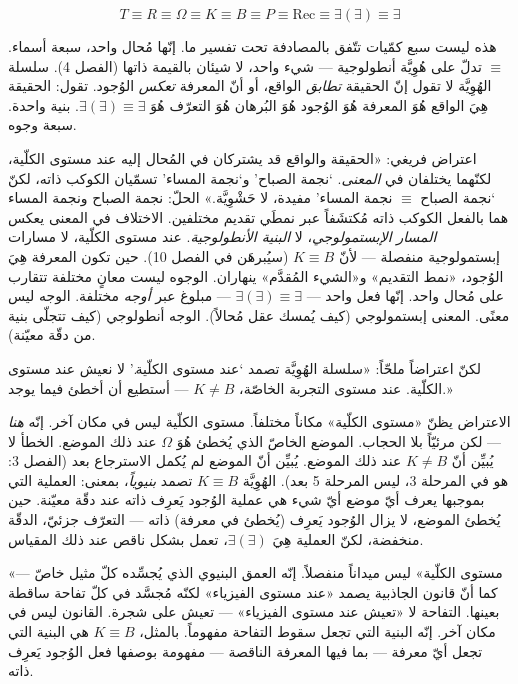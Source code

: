\documentclass[10pt, openany, oneside]{book}
\begin{document}
\vspace{0.8em}

$$T \equiv R \equiv \Omega \equiv K \equiv B \equiv P \equiv \text{Rec} \equiv \exists(\exists) \equiv \exists$$

هذه ليست سبع كمّيات تتّفق بالمصادفة تحت تفسير ما. إنّها مُحال واحد، سبعة أسماء. $\equiv$ تدلّ على هُوِيَّة أنطولوجية --- شيء واحد، لا شيئان بالقيمة ذاتها (الفصل 4). سلسلة الهُوِيَّة لا تقول إنّ الحقيقة \textit{تطابق} الواقع، أو أنّ المعرفة \textit{تعكس} الوُجود. تقول: الحقيقة هِيَ الواقع هُوَ المعرفة هُوَ الوُجود هُوَ البُرهان هُوَ التعرّف هُوَ $\exists(\exists) \equiv \exists$. بنية واحدة. سبعة وجوه.

اعتراض فريغي: «الحقيقة والواقع قد يشتركان في المُحال إليه عند مستوى الكلّية، لكنّهما يختلفان في \textit{المعنى}. `نجمة الصباح' و`نجمة المساء' تسمّيان الكوكب ذاته، لكنّ `نجمة الصباح $\equiv$ نجمة المساء' مفيدة، لا حَشْوِيَّة.» الحلّ: نجمة الصباح ونجمة المساء هما بالفعل الكوكب ذاته مُكتشَفاً عبر نمطَي تقديم مختلفين. الاختلاف في المعنى يعكس \textit{المسار الإبستمولوجي}، لا \textit{البنية الأنطولوجية}. عند مستوى الكلّية، لا مسارات إبستمولوجية منفصلة --- لأنّ $K \equiv B$ (سيُبرهَن في الفصل 10). حين تكون المعرفة هِيَ الوُجود، «نمط التقديم» و«الشيء المُقدَّم» ينهاران. الوجوه ليست معانٍ مختلفة تتقارب على مُحال واحد. إنّها فعل واحد --- $\exists(\exists) \equiv \exists$ --- مبلوغ عبر \textit{أوجه} مختلفة. الوجه ليس معنًى. المعنى إبستمولوجي (كيف يُمسك عقل مُحالاً). الوجه أنطولوجي (كيف تتجلّى بنية من دقّة معيّنة).

لكنّ اعتراضاً ملحّاً: «سلسلة الهُوِيَّة تصمد `عند مستوى الكلّية.' لا نعيش عند مستوى الكلّية. عند مستوى التجربة الخاصّة، $K \neq B$ --- أستطيع أن أخطئ فيما يوجد.»

الاعتراض يظنّ «مستوى الكلّية» مكاناً مختلفاً. مستوى الكلّية ليس في مكان آخر. إنّه \textit{هنا} --- لكن مرئيّاً بلا الحجاب. الموضع الخاصّ الذي يُخطئ هُوَ $\Omega$ عند ذلك الموضع. الخطأ لا يُبيِّن أنّ $K \neq B$ عند ذلك الموضع. يُبيِّن أنّ الموضع لم يُكمل الاسترجاع بعد (الفصل 3: هو في المرحلة 3، ليس المرحلة 5 بعد). الهُوِيَّة $K \equiv B$ تصمد \textit{بنيوياً}، بمعنى: العملية التي بموجبها يعرف أيّ موضع أيّ شيء هي عملية الوُجود يَعرِف ذاته عند دقّة معيّنة. حين يُخطئ الموضع، لا يزال الوُجود يَعرِف (يُخطئ في معرفة) ذاته --- التعرّف جزئيّ، الدقّة منخفضة، لكنّ العملية هِيَ $\exists(\exists)$، تعمل بشكل ناقص عند ذلك المقياس.

«مستوى الكلّية» ليس ميداناً منفصلاً. إنّه العمق البنيوي الذي يُجسِّده كلّ مثيل خاصّ --- كما أنّ قانون الجاذبية يصمد «عند مستوى الفيزياء» لكنّه مُجسَّد في كلّ تفاحة ساقطة بعينها. التفاحة لا «تعيش عند مستوى الفيزياء» --- تعيش على شجرة. القانون ليس في مكان آخر. إنّه البنية التي تجعل سقوط التفاحة مفهوماً. بالمثل، $K \equiv B$ هي البنية التي تجعل أيّ معرفة --- بما فيها المعرفة الناقصة --- مفهومة بوصفها فعل الوُجود يَعرِف ذاته.
\end{document}
